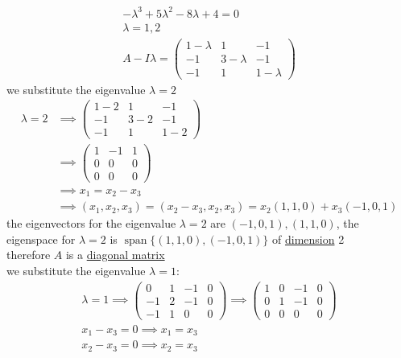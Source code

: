 \documentclass[a4paper,12pt]{article}
\DeclareMathOperator{\spn}{span}
\begin{document}
\begin{definition}
\begin{question}
\begin{subquestion}
\begin{answer}
\begin{step}
\begin{gather*}
  -\lambda^3 + 5\lambda^2 - 8\lambda + 4 = 0\\
  \lambda = 1,2\\
  A - I\lambda = \begin{pmatrix} 1-\lambda & 1 & -1\\ -1 & 3-\lambda & -1\\ -1 & 1 & 1-\lambda \end{pmatrix}
\end{gather*}
we substitute the eigenvalue \(\lambda = 2\)\\
\begin{align*}
  \lambda = 2 &\implies \begin{pmatrix} 1-2 & 1 & -1\\ -1 & 3-2 & -1\\ -1 & 1 & 1-2 \end{pmatrix}\\
  &\implies \begin{pmatrix} 1 & -1 & 1\\ 0 & 0 & 0\\ 0 & 0 & 0 \end{pmatrix}\\
  &\implies x_1 = x_2 - x_3\\
  &\implies (x_1,x_2,x_3) = (x_2-x_3,x_2,x_3) = x_2(1,1,0) + x_3(-1,0,1)
\end{align*}
the eigenvectors for the eigenvalue \(\lambda = 2\) are \((-1,0,1),(1,1,0)\), the eigenspace for \(\lambda = 2\) is \(\spn\{(1,1,0),(-1,0,1)\}\) of \hyperref[sec:orgdef24d1]{dimension} 2\\
therefore \(A\) is a \hyperref[sec:org136aa39]{diagonal matrix}\\
we substitute the eigenvalue \(\lambda = 1\):\\
\begin{gather*}
  \lambda = 1 \implies \left(\begin{array}{ccc|c} 0 & 1 & -1 & 0\\ -1 & 2 & -1 & 0\\ -1 & 1 & 0 & 0 \end{array}\right) \implies \left(\begin{array}{ccc|c} 1 & 0 & -1 & 0\\ 0 & 1 & -1 & 0\\ 0 & 0 & 0 & 0 \end{array}\right)\\
  x_1-x_3=0 \implies x_1=x_3\\
  x_2-x_3=0 \implies x_2=x_3\\

\end{gather*}
\end{step}
\end{answer}
\end{subquestion}
\end{question}
\end{definition}
\end{document}
